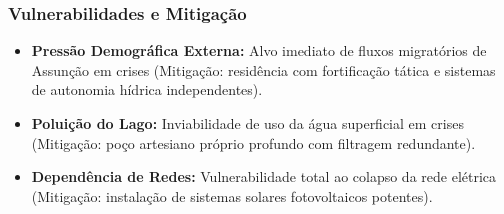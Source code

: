 \subsubsection{Vulnerabilidades e
Mitigação}

\begin{itemize}
\tightlist
\item
  \textbf{Pressão Demográfica Externa:} Alvo imediato de fluxos
  migratórios de Assunção em crises (Mitigação: residência com
  fortificação tática e sistemas de autonomia hídrica independentes).
\item
  \textbf{Poluição do Lago:} Inviabilidade de uso da água superficial em
  crises (Mitigação: poço artesiano próprio profundo com filtragem
  redundante).
\item
  \textbf{Dependência de Redes:} Vulnerabilidade total ao colapso da
  rede elétrica (Mitigação: instalação de sistemas solares fotovoltaicos
  potentes).
\end{itemize}

